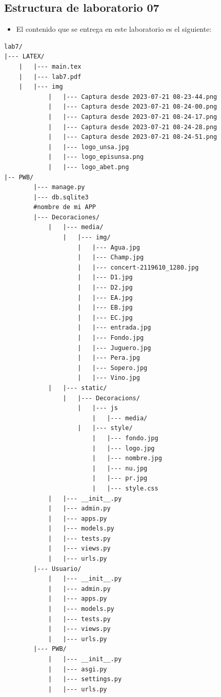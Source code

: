 \documentclass{article}
\begin{document}
	\subsection{Estructura de laboratorio 07}
	\begin{itemize}	
		\item El contenido que se entrega en este laboratorio es el siguiente:
	\end{itemize}
\begin{lstlisting}[style=ascii-tree]
lab7/
|--- LATEX/
    |   |--- main.tex
    |   |--- lab7.pdf
    |   |--- img
            |   |--- Captura desde 2023-07-21 08-23-44.png
            |   |--- Captura desde 2023-07-21 08-24-00.png
            |   |--- Captura desde 2023-07-21 08-24-17.png
            |   |--- Captura desde 2023-07-21 08-24-28.png
            |   |--- Captura desde 2023-07-21 08-24-51.png
            |   |--- logo_unsa.jpg
            |   |--- logo_episunsa.png
            |   |--- logo_abet.png
|-- PWB/
        |--- manage.py
        |--- db.sqlite3
        #nombre de mi APP
        |--- Decoraciones/
            |   |--- media/
                |   |--- img/
                    |   |--- Agua.jpg
                    |   |--- Champ.jpg
                    |   |--- concert-2119610_1280.jpg
                    |   |--- D1.jpg
                    |   |--- D2.jpg
                    |   |--- EA.jpg
                    |   |--- EB.jpg
                    |   |--- EC.jpg
                    |   |--- entrada.jpg
                    |   |--- Fondo.jpg
                    |   |--- Juguero.jpg
                    |   |--- Pera.jpg
                    |   |--- Sopero.jpg
                    |   |--- Vino.jpg
            |   |--- static/
                |   |--- Decoracions/
                    |   |--- js
                        |   |--- media/
                    |   |--- style/
                        |   |--- fondo.jpg
                        |   |--- logo.jpg
                        |   |--- nombre.jpg
                        |   |--- nu.jpg
                        |   |--- pr.jpg
                        |   |--- style.css
            |   |--- __init__.py
            |   |--- admin.py
            |   |--- apps.py
            |   |--- models.py
            |   |--- tests.py
            |   |--- views.py
            |   |--- urls.py
        |--- Usuario/
            |   |--- __init__.py
            |   |--- admin.py
            |   |--- apps.py
            |   |--- models.py
            |   |--- tests.py
            |   |--- views.py
            |   |--- urls.py
        |--- PWB/
            |   |--- __init__.py
            |   |--- asgi.py
            |   |--- settings.py
            |   |--- urls.py
\end{lstlisting}    
\end{document}
